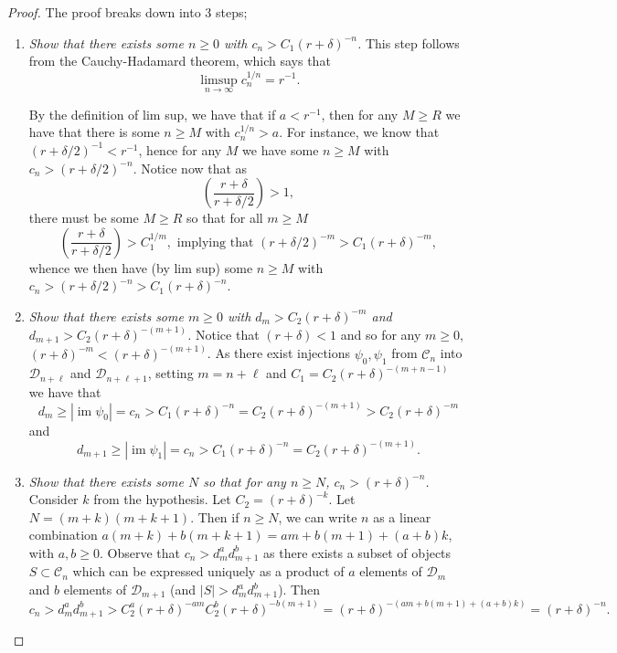 \documentclass[amsmath,longbibliography,secnumarabic,floatfix,amssymb,nofootinbib,nobibnotes,letterpaper,11pt,notitlepage,tightenlines]{revtex4-1}
\newcommand{\ArbClass}{\mathscr{C}}
\newcommand{\ArbSubClass}{\mathscr{D}}
\newcommand{\arbsubclass}{d}
\newcommand{\arbclass}{c}
\DeclareMathOperator{\im}{im}
\begin{document}
\begin{proof}
The proof breaks down into 3 steps;
\begin{enumerate}
\item \emph{Show that there exists some $n \ge 0$ with $\arbclass_n > C_1(r + \delta)^{-n}$.} This
  step follows from the Cauchy-Hadamard theorem, which says that
  \[ \limsup_{n\to\infty}{\arbclass_n^{1/n}} = r^{-1}. \]

  By the definition of lim sup, we have that if $a < r^{-1}$, then for any $M \ge R$ we have that there is
  some $n \ge M$ with $\arbclass_n^{1/n} > a$. For instance, we know that $(r + \delta/2)^{-1} < r^{-1}$,
  hence for any $M$ we have some $n \ge M$ with $\arbclass_n > (r+\delta/2)^{-n}$. Notice now that as
  \[ \left( \frac{r+\delta}{r + \delta/2} \right) > 1, \] there must be some $M \ge R$ so that for all $m
  \ge M$
  \[ \left( \frac{r+\delta}{r + \delta/2} \right) > C_1^{1/m}, \text{ implying that } (r +
  \delta/2)^{-m} > C_1(r + \delta)^{-m}, \] whence we then have (by lim sup) some $n \ge M$ with
  $c_n > (r+\delta/2)^{-n} > C_1(r+\delta)^{-n}$.
\item \emph{Show that there exists some $m \ge 0$ with $\arbsubclass_m > C_2(r + \delta)^{-m}$ and
    $\arbsubclass_{m+1} > C_2(r + \delta)^{-(m+1)}$.} Notice that $(r + \delta) < 1$ and so for any
  $m \ge 0$, $(r + \delta)^{-m} < (r+\delta)^{-(m+1 )}$. As there exist injections $\psi_0, \psi_1$
  from $\ArbClass_n$ into $\ArbSubClass_{n+\ell}$ and $\ArbSubClass_{n+\ell+1}$, setting $m = n +
  \ell$ and $C_1 = C_2(r+\delta)^{-(m+n-1)}$ we have that
  \[ \arbsubclass_m \ge |\im \psi_0| = \arbclass_n > C_1(r+\delta)^{-n} = C_2(r+\delta)^{-(m+1)} >
  C_2(r+\delta)^{-m} \]
  and
  \[ \arbsubclass_{m+1} \ge |\im \psi_1| = \arbclass_n > C_1(r+\delta)^{-n} =
  C_2(r+\delta)^{-(m+1)}. \]
\item \emph{Show that there exists some $N$ so that for any $n \ge N$, $\arbclass_n > (r +
    \delta)^{-n}$.} Consider $k$ from the hypothesis. Let $C_2 = (r + \delta)^{-k}$. Let $N = (m +
  k)(m + k + 1)$. Then if $n \ge N$, we can write $n$ as a linear combination $a(m + k) + b(m + k +
  1) = am + b(m + 1) + (a+b)k$, with $a, b \ge 0$. Observe that $c_n >
  \arbsubclass_m^a\arbsubclass_{m+1}^b$ as there exists a subset of objects $S \subset \ArbClass_n$
  which can be expressed uniquely as a product of $a$ elements of $\ArbSubClass_m$ and $b$ elements
  of $\ArbSubClass_{m+1}$ (and $|S| > \arbsubclass_m^a\arbsubclass_{m+1}^b$). Then
  \[ c_n > d_m^ad_{m+1}^b > C_2^a(r+\delta)^{-am}C_2^b(r+\delta)^{-b(m+1)} = (r+\delta)^{-(am +b(m+1)+(a+b)k)} = (r+\delta)^{-n}.\]
\end{enumerate}


\end{proof}
\end{document}
